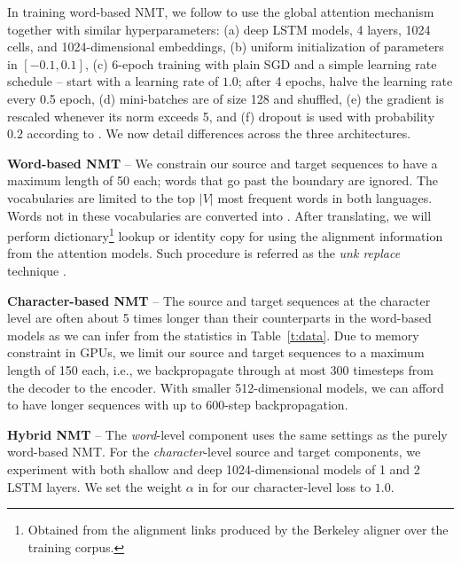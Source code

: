 In training word-based NMT, we follow  to use the global attention mechanism together with
similar hyperparameters: (a) deep LSTM models, 4 layers, 1024
cells, and 1024-dimensional embeddings, (b) uniform initialization of
parameters in $[-0.1, 0.1]$, (c) 6-epoch training with plain SGD and a simple learning
rate schedule -- start with a learning rate of $1.0$; after 4 epochs,
halve the learning rate every 0.5 epoch, (d) mini-batches are of
size 128 and shuffled, (e) the gradient is rescaled whenever its norm exceeds 5, and (f)
dropout is used with probability $0.2$ according to 
\cite{pham2014dropout}.
We now detail differences across the three architectures.


{\bf Word-based NMT} -- We constrain our source and target sequences to
have a maximum length of 50 each; words that go past the boundary are ignored.
The vocabularies are limited to the top $|V|$ most %
frequent words in both languages. Words not in these vocabularies
are converted into \unk{}. After translating, we will perform
dictionary\footnote{Obtained from the alignment links produced by the Berkeley
aligner \cite{liang06alignment} over
the training corpus.} lookup or
identity copy for \unk{} using the alignment information from the
attention models. Such procedure is referred as the {\it unk replace}
technique \cite{luong15,jean15}.

{\bf Character-based NMT} -- The source and
target sequences at the character level are often about 5 times longer than their counterparts in the
word-based models as we can infer from the statistics in
Table~\ref{t:data}. Due to memory constraint in GPUs, we limit our source and
target sequences to a maximum length of 150 each, i.e., we backpropagate
through at most 300 timesteps from the decoder to the encoder. With
smaller 512-dimensional models, we can afford to have longer sequences with up
to 600-step backpropagation. 

{\bf Hybrid NMT} -- The {\it word}-level component uses the
same settings as the purely word-based NMT. For the {\it character}-level source
and target components, we experiment with both shallow and deep 1024-dimensional models of
1 and 2 LSTM layers. 
We
set the weight $\alpha$ in  for our character-level loss to
$1.0$.

